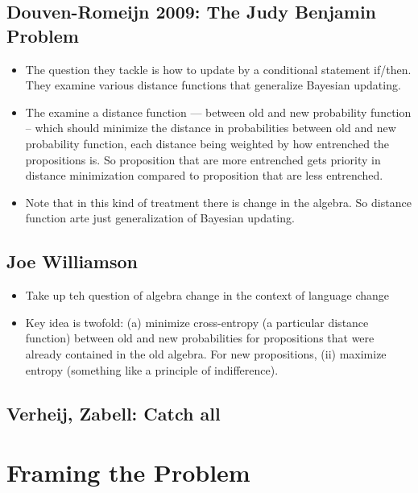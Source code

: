 \documentclass[
  11pt,
  dvipsnames,enabledeprecatedfontcommands]{scrartcl}
\begin{document}
\hypertarget{douven-romeijn-2009-the-judy-benjamin-problem}{%
\subsection{Douven-Romeijn 2009: The Judy Benjamin
Problem}\label{douven-romeijn-2009-the-judy-benjamin-problem}}

\begin{itemize}
\item
  The question they tackle is how to update by a conditional statement
  if/then. They examine various distance functions that generalize
  Bayesian updating.
\item
  The examine a distance function --- between old and new probability
  function -- which should minimize the distance in probabilities
  between old and new probability function, each distance being weighted
  by how entrenched the propositions is. So proposition that are more
  entrenched gets priority in distance minimization compared to
  proposition that are less entrenched.
\item
  Note that in this kind of treatment there is change in the algebra. So
  distance function arte just generalization of Bayesian updating.
\end{itemize}

\hypertarget{joe-williamson}{%
\subsection{Joe Williamson}\label{joe-williamson}}

\begin{itemize}
\item
  Take up teh question of algebra change in the context of language
  change
\item
  Key idea is twofold: (a) minimize cross-entropy (a particular distance
  function) between old and new probabilities for propositions that were
  already contained in the old algebra. For new propositions, (ii)
  maximize entropy (something like a principle of indifference).
\end{itemize}

\hypertarget{verheij-zabell-catch-all}{%
\subsection{Verheij, Zabell: Catch all}\label{verheij-zabell-catch-all}}

\hypertarget{framing-the-problem}{%
\section{Framing the Problem}\label{framing-the-problem}}
\end{document}
